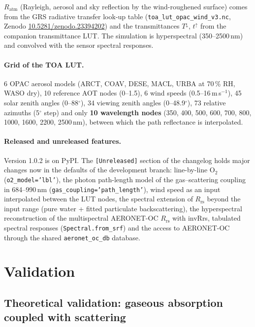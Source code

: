 \documentclass[11pt,a4paper]{article}
\newcommand{\Rrs}{R_\mathrm{rs}}
\newcommand{\code}[1]{\texttt{#1}}
\begin{document}
$R_\mathrm{atm}$ (Rayleigh, aerosol and sky reflection by the wind-roughened surface) comes from the
GRS radiative transfer look-up table (\code{toa\_lut\_opac\_wind\_v3.nc}, Zenodo
\href{https://doi.org/10.5281/zenodo.23394202}{10.5281/zenodo.23394202}) and the transmittances
$T^{\downarrow}$, $t^{\uparrow}$ from the companion transmittance LUT. The simulation is hyperspectral
(350--2500\,nm) and convolved with the sensor spectral responses.

\paragraph{Grid of the TOA LUT.} 6 OPAC aerosol models (ARCT, COAV, DESE, MACL, URBA at 70\,\% RH, WASO dry),
10 reference AOT nodes (0--1.5), 6 wind speeds (0.5--16\,m\,s$^{-1}$), 45 solar zenith angles (0--88$^\circ$),
34 viewing zenith angles (0--48.9$^\circ$), 73 relative azimuths (5$^\circ$ step) and only
\textbf{10 wavelength nodes} (350, 400, 500, 600, 700, 800, 1000, 1600, 2200, 2500\,nm), between which the
path reflectance is interpolated.

\paragraph{Released and unreleased features.} Version 1.0.2 is on PyPI. The \code{[Unreleased]} section of the
changelog holds major changes now in the defaults of the development branch:
line-by-line O$_2$ (\code{o2\_model='lbl'}), the photon path-length model of the gas--scattering coupling
in 684--990\,nm (\code{gas\_coupling='path\_length'}), wind speed as an input interpolated between the LUT
nodes, the spectral extension of $\Rrs$ beyond the input range (pure water + fitted particulate
backscattering), the hyperspectral reconstruction of the multispectral AERONET-OC $\Rrs$ with invRrs, tabulated
spectral responses (\code{Spectral.from\_srf}) and the access to AERONET-OC through the shared
\code{aeronet\_oc\_db} database.

\section{Validation}

\subsection{Theoretical validation: gaseous absorption coupled with scattering}
\end{document}
